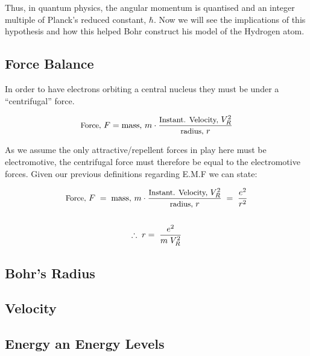 \documentclass[colorlinks,11pt,a4paper,normalphoto,withhyper,ragged2e]{altareport}
\begin{document}
		\vspace{5mm}
		
		Thus, in quantum physics, the angular momentum is quantised and an integer multiple of Planck's reduced constant, $\hbar$. Now we will see the implications of this hypothesis and how this helped Bohr construct his model of the Hydrogen atom. \linebreak
		
		
	\subsection{Force Balance}
		In order to have electrons orbiting a central nucleus they must be under a ``centrifugal'' force. \linebreak
		
		\begin{equation*}
			\text{\small Force, }F = \text{mass, }m \cdot \frac{\text{\small Instant. Velocity, }V_R^2}{\text{\small radius, }r}
		\end{equation*}
		
		\vspace{5mm}
		
		As we assume the only attractive/repellent forces in play here must be electromotive, the centrifugal force must therefore be equal to the electromotive forces. Given our previous definitions regarding E.M.F we can state: \linebreak
		
		\begin{gather*}
			\text{\small Force, }F \; = \; \text{mass, }m \cdot \frac{\text{\small Instant. Velocity, }V_R^2}{\text{\small radius, }r} \; = \; \frac{e^2}{r^2} \\
			\\
			\therefore \;  r = \; \frac{e^2}{m \; V_R^2}
		\end{gather*}
		
		
	\subsection{Bohr’s Radius}
		
		
	\subsection{Velocity}
	
	
	\subsection{Energy an Energy Levels}
	
\end{document}
